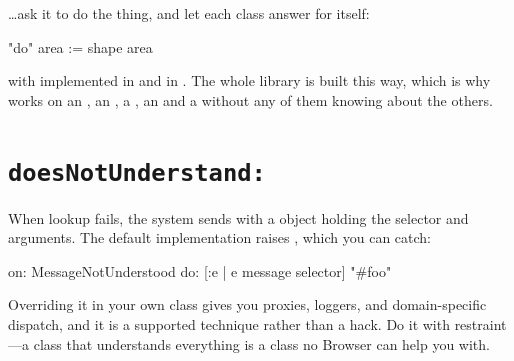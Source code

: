 \ldots ask it to do the thing, and let each class answer for itself:

\begin{st}
"do"
area := shape area
\end{st}

with  implemented in  and in . The whole
library is built this way, which is why  works on an , an
, a , an  and a 
without any of them knowing about the others.

\section{\texttt{doesNotUnderstand:}}

When lookup fails, the system sends  with a
 object holding the selector and arguments. The default
implementation raises , which you can catch:

\begin{st}
 on: MessageNotUnderstood do: [:e | e message selector]    "#foo"
\end{st}

Overriding it in your own class gives you proxies, loggers, and
domain-specific dispatch, and it is a supported technique rather than a hack.
Do it with restraint---a class that understands everything is a class no
Browser can help you with.
